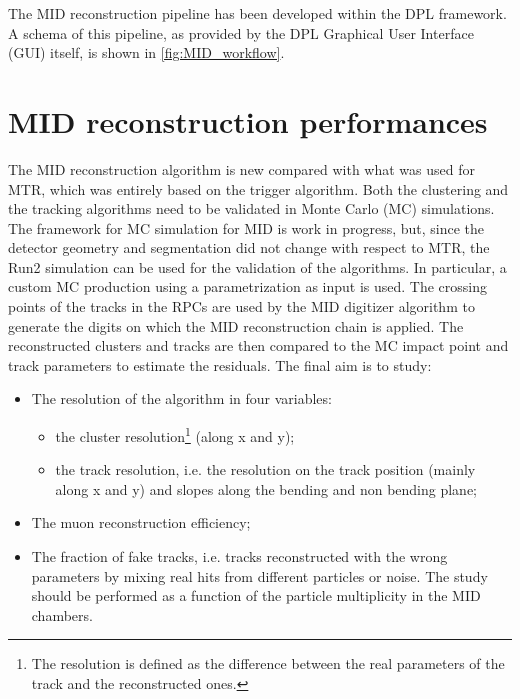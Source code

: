 The MID reconstruction pipeline has been developed within the DPL framework.
A schema of this pipeline, as provided by the DPL Graphical User Interface (GUI) itself, is shown in \ref{fig:MID_workflow}.

\section{MID reconstruction performances}
The MID reconstruction algorithm is new compared with what was used for MTR, which was entirely based on the trigger algorithm.
Both the clustering and the tracking algorithms need to be validated in Monte Carlo (MC) simulations. 
The framework for MC simulation for MID is work in progress, but, since the detector geometry and segmentation did not change with respect to MTR, the Run2 simulation can be used for the validation of the algorithms. 
In particular, a custom MC production using a \jpsi parametrization as input is used. 
The crossing points of the tracks in the RPCs are used by the MID digitizer algorithm to generate the digits on which the MID reconstruction chain is applied. 
The reconstructed clusters and tracks are then compared to the MC impact point and track parameters to estimate the residuals. 
The final aim is to study:
\begin{itemize}
    \item The resolution of the algorithm in four variables: 
    \begin{itemize}
        \item the cluster resolution\footnote{The resolution is defined as the difference between the real parameters of the track and the reconstructed ones.} (along x and y);
        \item the track resolution, i.e. the resolution on the track position (mainly along x and y) and slopes along the bending and non bending plane;
    \end{itemize}
    
    \item The muon reconstruction efficiency;
    \item The fraction of fake tracks, i.e. tracks reconstructed with the wrong parameters by mixing real hits from different particles or noise. The study should be performed as a function of the particle multiplicity in the MID chambers.
\end{itemize}

